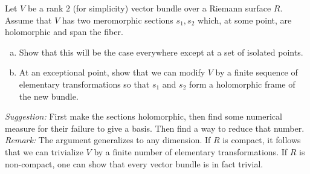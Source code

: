 \documentclass[12pt]{article}  %
\begin{document}
\begin{problem}[2]
Let $V$ be a rank $2$ (for simplicity) vector bundle over a Riemann surface $R$. Assume that $V$ has two meromorphic sections $s_1, s_2$ which, at some point, are holomorphic and span the fiber.
\begin{enumerate}[(a)]
    \item Show that this will be the case everywhere except at a set of isolated points.
    \item At an exceptional point, show that we can modify $V$ by a finite sequence of elementary transformations so that $s_1$ and $s_2$ form a holomorphic frame of the new bundle.
\end{enumerate}
\textit{Suggestion:} First make the sections holomorphic, then find some numerical measure for their failure to give a basis. Then find a way to reduce that number.\\
\textit{Remark:} The argument generalizes to any dimension. If $R$ is compact, it follows that we can trivialize $V$ by a finite number of elementary transformations. If $R$ is non-compact, one can show that every vector bundle is in fact trivial.
\end{problem}
\end{document}
